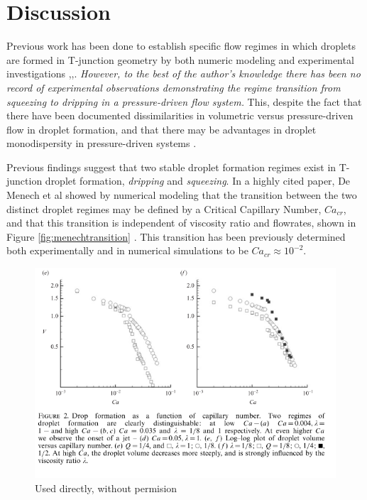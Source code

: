 \clearpage


\section{Discussion}

Previous work has been done to establish specific flow regimes in which droplets are formed in T-junction geometry by both numeric modeling and experimental investigations \cite{Abate2012a},\cite{DeMenech2008},\cite{Garstecki2006}. \emph{However, to the best of the author's knowledge there has been no record of experimental observations demonstrating the regime transition from squeezing to dripping in a pressure-driven flow system.} This, despite the fact that there have been documented dissimilarities in volumetric versus pressure-driven flow in droplet formation\cite{Ward2005}, and that there may be advantages in droplet monodispersity in pressure-driven systems \cite{Christopher2008}\cite{Li2014a}. 

Previous findings suggest that two stable droplet formation regimes exist in T-junction droplet formation, \emph{dripping} and \emph{squeezing}. In a highly cited paper, De Menech et al showed by numerical modeling that the transition between the two distinct droplet regimes may be defined by a Critical Capillary Number, $Ca_{cr}$, and that this transition is independent of viscosity ratio and flowrates, shown in Figure \vref{fig:menechtransition} \cite{DeMenech2008}. This transition has been previously determined both experimentally and in numerical simulations to be $Ca_{cr}\approx 10^{-2}$.

\begin{figure}[H]
\centering 
\includegraphics[width=0.75\columnwidth]{menechtransition.PNG} 
\caption[Menech Regime Transition]{Used directly, without permision} 
\label{fig:menechtransition} 
\end{figure}

